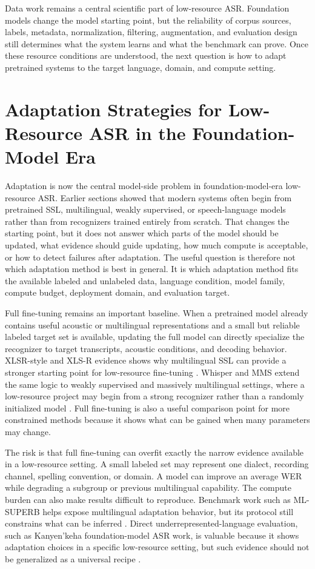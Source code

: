 \documentclass[pdflatex,sn-basic]{sn-jnl}
\theoremstyle{thmstyleone}
\theoremstyle{thmstyletwo}
\theoremstyle{thmstylethree}
\begin{document}
Data work remains a central scientific part of low-resource ASR. Foundation models change the model starting point, but the reliability of corpus sources, labels, metadata, normalization, filtering, augmentation, and evaluation design still determines what the system learns and what the benchmark can prove. Once these resource conditions are understood, the next question is how to adapt pretrained systems to the target language, domain, and compute setting.

\section{Adaptation Strategies for Low-Resource ASR in the Foundation-Model Era}

Adaptation is now the central model-side problem in foundation-model-era low-resource ASR. Earlier sections showed that modern systems often begin from pretrained SSL, multilingual, weakly supervised, or speech-language models rather than from recognizers trained entirely from scratch. That changes the starting point, but it does not answer which parts of the model should be updated, what evidence should guide updating, how much compute is acceptable, or how to detect failures after adaptation. The useful question is therefore not which adaptation method is best in general. It is which adaptation method fits the available labeled and unlabeled data, language condition, model family, compute budget, deployment domain, and evaluation target.

Full fine-tuning remains an important baseline. When a pretrained model already contains useful acoustic or multilingual representations and a small but reliable labeled target set is available, updating the full model can directly specialize the recognizer to target transcripts, acoustic conditions, and decoding behavior. XLSR-style and XLS-R evidence shows why multilingual SSL can provide a stronger starting point for low-resource fine-tuning \citep{conneau21_interspeech,babu22_interspeech}. Whisper and MMS extend the same logic to weakly supervised and massively multilingual settings, where a low-resource project may begin from a strong recognizer rather than a randomly initialized model \citep{pmlr-v202-radford23a,pratap2024mms}. Full fine-tuning is also a useful comparison point for more constrained methods because it shows what can be gained when many parameters may change.

The risk is that full fine-tuning can overfit exactly the narrow evidence available in a low-resource setting. A small labeled set may represent one dialect, recording channel, spelling convention, or domain. A model can improve an average WER while degrading a subgroup or previous multilingual capability. The compute burden can also make results difficult to reproduce. Benchmark work such as ML-SUPERB helps expose multilingual adaptation behavior, but its protocol still constrains what can be inferred \citep{shi2023mlsuperb}. Direct underrepresented-language evaluation, such as Kanyen'keha foundation-model ASR work, is valuable because it shows adaptation choices in a specific low-resource setting, but such evidence should not be generalized as a universal recipe \citep{geng25c_interspeech}.
\end{document}

